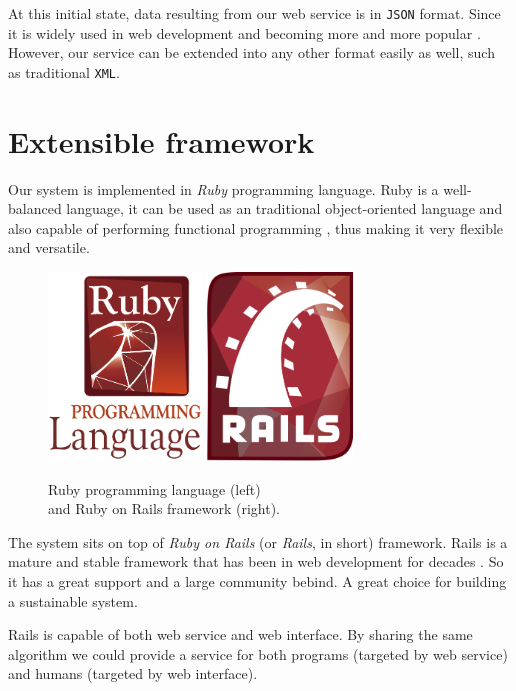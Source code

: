 At this initial state, data resulting from our web service
is in \texttt{JSON} \cite{json} format. Since it is widely used in web development
and becoming more and more popular \cite{rest}. However, our service can be extended
into any other format easily as well, such as traditional \texttt{XML}.

\section{Extensible framework}


Our system is implemented in \emph{Ruby} \cite{ruby} programming language.
Ruby is a well-balanced language, it can be used as an traditional
object-oriented language \cite{rubyoo} and also capable of performing
functional programming \cite[]{rubyfp}, thus making it very flexible and versatile.

\begin{figure}
\centering
\captionsetup{justification=centering}
\includegraphics[height=5cm]{gfx/ruby}
\hspace{0.5cm}
\includegraphics[height=5cm]{gfx/ror}
\caption[Ruby and Ruby on Rails]{Ruby programming language (left) \\
and Ruby on Rails framework (right).}
\end{figure}

The system sits on top of \emph{Ruby on Rails}
(or \emph{Rails}, in short) \cite{rails} framework.
Rails is a mature and stable framework that has been in
web development for decades \cite[]{railsd}. So it has a great support
and a large community bebind. A great choice for building a sustainable
system.

Rails is capable of both web service and web interface.
By sharing the same algorithm we could provide a service
for both programs (targeted by web service) and humans
(targeted by web interface).
